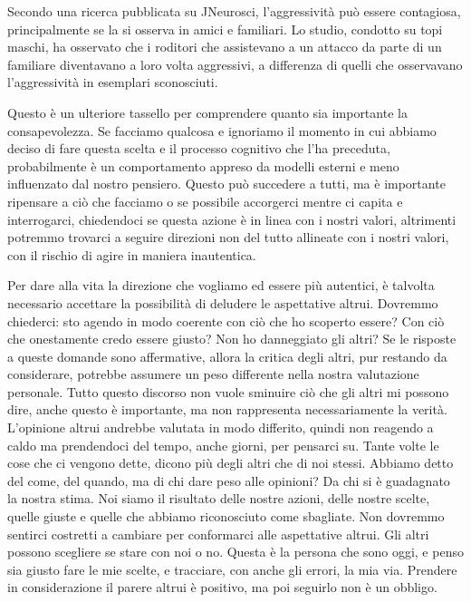 \documentclass[12pt]{book} %
\begin{document}
Secondo una ricerca pubblicata su JNeurosci, l'aggressività può essere contagiosa, principalmente se la si osserva in amici e familiari. Lo studio, condotto su topi maschi, ha osservato che i roditori che assistevano a un attacco da parte di un familiare diventavano a loro volta aggressivi, a differenza di quelli che osservavano l'aggressività in esemplari sconosciuti.

Questo è un ulteriore tassello per comprendere quanto sia importante la consapevolezza. Se facciamo qualcosa e ignoriamo
il momento in cui abbiamo deciso di fare questa scelta e il processo cognitivo che l'ha preceduta, probabilmente è un comportamento appreso da modelli esterni e meno influenzato dal nostro pensiero. Questo può succedere a
tutti, ma è importante ripensare a ciò che facciamo o se possibile accorgerci mentre ci capita e interrogarci,
chiedendoci se questa azione è in linea con i nostri valori, altrimenti potremmo trovarci a seguire direzioni non del tutto allineate con i nostri valori, con il rischio di agire in maniera inautentica.

Per dare alla vita la direzione che vogliamo ed essere più autentici, è talvolta necessario accettare la possibilità di deludere le aspettative altrui.
Dovremmo chiederci: sto agendo in modo coerente con ciò che ho scoperto essere? Con ciò che onestamente credo essere giusto? Non ho danneggiato gli altri? Se le risposte a queste domande sono affermative, allora la critica degli altri, pur restando da considerare, potrebbe assumere un peso differente nella nostra valutazione personale. Tutto questo discorso non vuole sminuire ciò che gli altri mi possono dire, anche questo è importante, ma non rappresenta necessariamente la verità.
L'opinione altrui andrebbe valutata in modo differito, quindi non reagendo a caldo ma prendendoci del tempo, anche giorni, per pensarci su. Tante volte le cose che ci vengono dette, dicono più degli altri che di noi stessi.
Abbiamo detto del come, del quando, ma di chi dare peso alle opinioni? Da chi si è guadagnato la nostra stima.
Noi siamo il risultato delle nostre azioni, delle nostre scelte, quelle giuste e quelle che abbiamo riconosciuto come sbagliate. Non dovremmo sentirci costretti a cambiare per conformarci alle aspettative altrui. Gli altri possono scegliere se stare con noi o no. Questa è la persona che sono oggi, e penso sia giusto fare le mie scelte, e tracciare, con anche gli errori, la mia via.
Prendere in considerazione il parere altrui è positivo, ma poi seguirlo non è un obbligo. 
\end{document}
